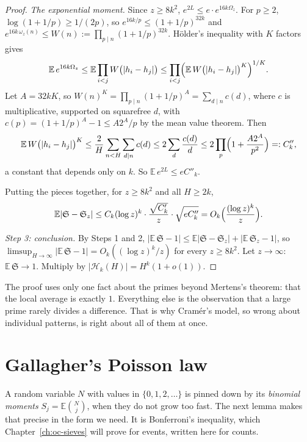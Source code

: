\begin{proof}
\emph{The exponential moment.} Since $z\ge8k^2$, $e^{2L}\le e\cdot e^{16k\Omega_z}$. For $p\ge2$, $\log(1+1/p)\ge1/(2p)$, so $e^{16k/p}\le(1+1/p)^{32k}$ and $e^{16k\,\omega_z(n)}\le W(n):=\prod_{p\mid n}(1+1/p)^{32k}$. Hölder's inequality with $K$ factors gives
\[
\mathbb E\,e^{16k\Omega_z}\le\mathbb E\prod_{i<j}W\bigl(|h_i-h_j|\bigr)\le\prod_{i<j}\Bigl(\mathbb E\,W\bigl(|h_i-h_j|\bigr)^K\Bigr)^{1/K}.
\]
Let $A=32kK$, so $W(n)^K=\prod_{p\mid n}(1+1/p)^A=\sum_{d\mid n}c(d)$, where $c$ is multiplicative, supported on squarefree $d$, with $c(p)=(1+1/p)^A-1\le A2^A/p$ by the mean value theorem. Then
\[
\mathbb E\,W\bigl(|h_i-h_j|\bigr)^K\le\frac2H\sum_{n<H}\sum_{d\mid n}c(d)\le2\sum_d\frac{c(d)}d\le2\prod_p\Bigl(1+\frac{A2^A}{p^2}\Bigr)=:C''_k,
\]
a constant that depends only on $k$. So $\mathbb E\,e^{2L}\le eC''_k$.

Putting the pieces together, for $z\ge8k^2$ and all $H\ge2k$,
\[
\mathbb E|\mathfrak S-\mathfrak S_z|\le C_k(\log z)^k\cdot\frac{\sqrt{C'_k}}z\cdot\sqrt{eC''_k}=O_k\Bigl(\frac{(\log z)^k}z\Bigr).
\]

\emph{Step 3: conclusion.} By Steps 1 and 2, $|\mathbb E\,\mathfrak S-1|\le\mathbb E|\mathfrak S-\mathfrak S_z|+|\mathbb E\,\mathfrak S_z-1|$, so $\limsup_{H\to\infty}|\mathbb E\,\mathfrak S-1|=O_k((\log z)^k/z)$ for every $z\ge8k^2$. Let $z\to\infty$: $\mathbb E\,\mathfrak S\to1$. Multiply by $|\mathcal H_k(H)|=H^k(1+o(1))$.
\end{proof}

The proof uses only one fact about the primes beyond Mertens's theorem: that the local average is exactly $1$. Everything else is the observation that a large prime rarely divides a difference. That is why Cram\'er's model, so wrong about individual patterns, is right about all of them at once.

\section{Gallagher's Poisson law}

A random variable $N$ with values in $\{0,1,2,\dots\}$ is pinned down by its \emph{binomial moments} $S_j=\mathbb E\binom Nj$, when they do not grow too fast. The next lemma makes that precise in the form we need. It is Bonferroni's inequality, which Chapter~\ref{ch:oc-sieves} will prove for events, written here for counts.

